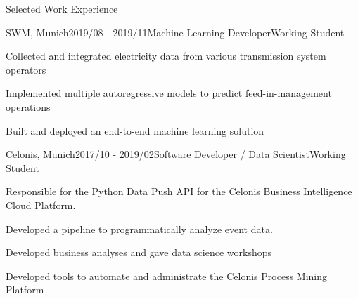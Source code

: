 \documentclass{resume} %
\begin{document}


\begin{rSection}{Selected Work Experience}

\begin{rSubsection}{SWM, Munich}{2019/08 - 2019/11}{Machine Learning Developer}{Working Student}
\item Collected and integrated electricity data from various 
transmission system operators
\item Implemented multiple autoregressive models to predict feed-in-management operations
\item Built and deployed an end-to-end machine learning solution
\end{rSubsection}

\begin{rSubsection}{Celonis, Munich}{2017/10 - 2019/02}{Software Developer / Data Scientist}{Working Student}
\item Responsible for the Python Data Push API for the Celonis Business Intelligence Cloud Platform.
\item Developed a pipeline to programmatically analyze event data.
\item Developed business analyses and gave data science workshops
\item Developed tools to automate and administrate the Celonis Process Mining Platform
\end{rSubsection}



\end{rSection}
\end{document}
